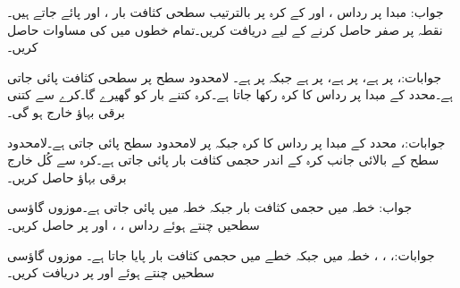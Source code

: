 جواب:
مبدا پر رداس ،  اور  کے کرہ پر بالترتیب سطحی کثافت بار ، 
 اور  پائے جاتے ہیں۔نقطہ  پر صفر  حاصل کرنے کے لیے  دریافت کریں۔تمام خطوں میں  کی مساوات حاصل کریں۔  

جوابات:،  پر  ہے،  پر  ہے، پر  ہے جبکہ  پر  ہے۔
لامحدود سطح  پر  سطحی کثافت پائی جاتی ہے۔محدد کے مبدا پر  رداس کا کرہ رکھا جاتا ہے۔کرہ کتنے بار کو گھیرے گا۔کرے سے کتنی برقی بہاؤ خارج ہو گی۔

جوابات:، 
محدد کے مبدا پر  رداس کا کرہ جبکہ  پر لامحدود سطح پائی جاتی ہے۔لامحدود سطح کے بالائی جانب کرہ کے اندر  حجمی کثافت
 بار  پائی جاتی ہے۔کرہ سے کُل خارج برقی بہاؤ حاصل کریں۔

جواب: 
خطہ  میں حجمی کثافت بار  جبکہ
 خطہ  میں  پائی جاتی ہے۔موزوں گاؤسی سطحیں چنتے ہوئے رداس ، ،  اور  پر  حاصل کریں۔

جوابات:، ، ، 
خطہ  میں  جبکہ  خطے میں  حجمی کثافت بار پایا جاتا ہے۔ موزوں گاؤسی سطحیں چنتے
 ہوئے   اور  پر  دریافت کریں۔

